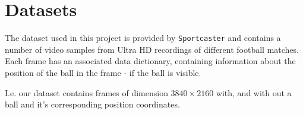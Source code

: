 \section{Datasets}

The dataset used in this project is provided by \texttt{Sportcaster}
and contains a number of video samples from Ultra HD recordings of
different football matches. Each frame has an associated data
dictionary, containing information about the position of the ball in
the frame - if the ball is visible.

I.e. our dataset contains frames of dimension $3840 \times 2160$ with,
and with out a ball and it's corresponding position coordinates.
